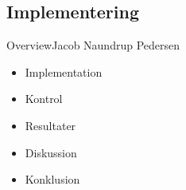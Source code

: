 \subsection{Implementering}


\begin{frame}{Overview}{Jacob Naundrup Pedersen}
 \vfill\vfill\centering  
\begin{itemize}
	
\item Implementation
\item Kontrol
\item Resultater
\item Diskussion
\item Konklusion
\end{itemize}
 \vfill\vfill
\end{frame}


